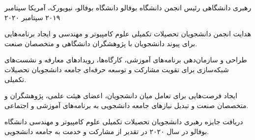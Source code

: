 
\begin{cventries}

\cventry
{رهبری دانشگاهی  رئیس انجمن}
{  دانشگاه بوفالو}
{دانشگاه بوفالو، نیویورک، آمریکا}
{سپتامبر ۲۰۱۹  سپتامبر ۲۰۲۰}
{
\begin{cvitems}
\item {هدایت انجمن دانشجویان تحصیلات تکمیلی علوم کامپیوتر و مهندسی و ایجاد برنامه‌هایی برای پیوند دانشجویان با پژوهشگران دانشگاهی و متخصصان صنعت.}
\item {طراحی و سازمان‌دهی برنامه‌های آموزشی، کارگاه‌ها، رویدادهای معارفه و نشست‌های شبکه‌سازی برای تقویت مشارکت و توسعه حرفه‌ای جامعه دانشجویان تحصیلات تکمیلی.}
\item {ایجاد فرصت‌هایی برای تعامل میان دانشجویان، اعضای هیئت علمی، پژوهشگران و متخصصان صنعت و تبدیل نیازهای جامعه دانشجویی به برنامه‌های آموزشی و اجتماعی.}
\item {دریافت جایزه رهبری دانشجویان تحصیلات تکمیلی علوم کامپیوتر و مهندسی دانشگاه بوفالو در سال ۲۰۲۰ در تقدیر از مشارکت و خدمت به جامعه دانشجویی.}
\end{cvitems}
}

\end{cventries}
